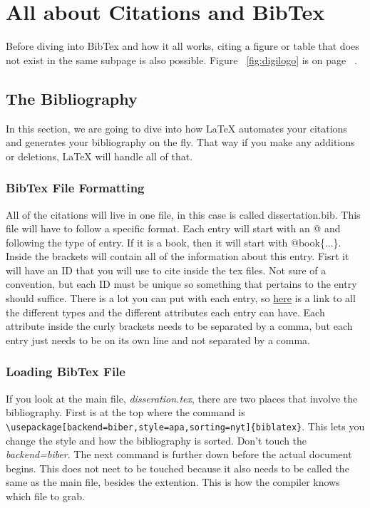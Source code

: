 \documentclass[./dissertation.tex]{subfiles}
\begin{document}
    \chapter{All about Citations and BibTex}
    Before diving into BibTex and how it all works, citing a figure or table that does not exist in the same subpage is also possible. Figure ~\ref{fig:digilogo} is on page ~\pageref{fig:digilogo}.
    \section{The Bibliography}
      In this section, we are going to dive into how LaTeX automates your citations and generates your bibliography on the fly. That way if you make any additions or deletions, LaTeX will handle all of that.
      \subsection{BibTex File Formatting}
        All of the citations will live in one file, in this case is called dissertation.bib. This file will have to follow a specific format. Each entry will start with an @ and following the type of entry. If it is a book, then it will start with @book\{...\}. Inside the brackets will contain all of the information about this entry. Fisrt it will have an ID that you will use to cite inside the tex files. Not sure of a convention, but each ID must be unique so something that pertains to the entry should suffice. There is a lot you can put with each entry, so \href{https://www2.cs.arizona.edu/~collberg/Teaching/07.231/BibTeX/bibtex.html}{here} is a link to all the different types and the different attributes each entry can have. Each attribute inside the curly brackets needs to be separated by a comma, but each entry just needs to be on its own line and not separated by a comma.
      \subsection{Loading BibTex File}
        If you look at the main file, \textit{disseration.tex}, there are two places that involve the bibliography. First is at the top where the command is \verb+\usepackage[backend=biber,style=apa,sorting=nyt]{biblatex}+. This lets you change the style and how the bibliography is sorted. Don't touch the \textit{backend=biber}. The next command is \verb++ further down before the actual document begins. This does not neet to be touched because it also needs to be called the same as the main file, besides the extention. This is how the compiler knows which file to grab.
\end{document}
